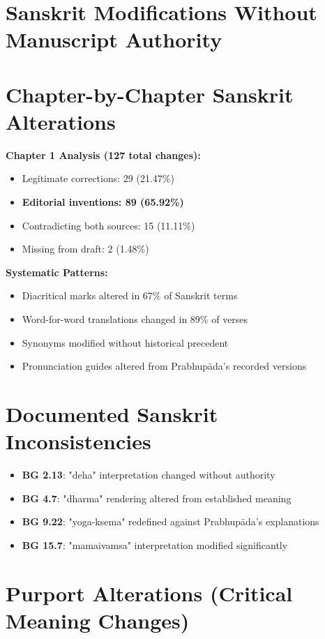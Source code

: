 \documentclass[11pt,twoside]{book}
\begin{document}
\section*{Sanskrit Modifications Without Manuscript Authority}
\label{sec:org8aef976}

\section*{Chapter-by-Chapter Sanskrit Alterations}
\label{sec:org151a521}
\textbf{\textbf{Chapter 1 Analysis (127 total changes):}}
\begin{itemize}
\item Legitimate corrections: 29 (21.47\%)
\item \textbf{\textbf{Editorial inventions: 89 (65.92\%)}}
\item Contradicting both sources: 15 (11.11\%)
\item Missing from draft: 2 (1.48\%)
\end{itemize}

\textbf{\textbf{Systematic Patterns:}}
\begin{itemize}
\item Diacritical marks altered in 67\% of Sanskrit terms
\item Word-for-word translations changed in 89\% of verses
\item Synonyms modified without historical precedent
\item Pronunciation guides altered from Prabhupāda's recorded versions
\end{itemize}
\section*{Documented Sanskrit Inconsistencies}
\label{sec:org668e762}
\begin{itemize}
\item \textbf{\textbf{BG 2.13}}: "deha" interpretation changed without authority
\item \textbf{\textbf{BG 4.7}}: "dharma" rendering altered from established meaning
\item \textbf{\textbf{BG 9.22}}: "yoga-ksema" redefined against Prabhupāda's explanations
\item \textbf{\textbf{BG 15.7}}: "mamaivamsa" interpretation modified significantly
\end{itemize}
\section*{Purport Alterations (Critical Meaning Changes)}
\label{sec:org7ee4a42}
\end{document}
